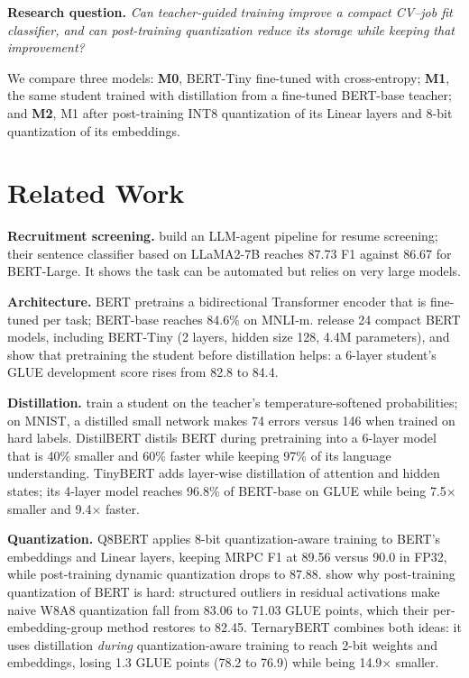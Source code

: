 \documentclass[11pt]{article}
\begin{document}
\textbf{Research question.} \emph{Can teacher-guided training improve a compact CV--job fit classifier, and can post-training quantization reduce its storage while keeping that improvement?}

We compare three models: \textbf{M0}, BERT-Tiny fine-tuned with cross-entropy; \textbf{M1}, the same student trained with distillation from a fine-tuned BERT-base teacher; and \textbf{M2}, M1 after post-training INT8 quantization of its Linear layers and 8-bit quantization of its embeddings.

\section{Related Work}
\textbf{Recruitment screening.} \citet{gan} build an LLM-agent pipeline for resume screening; their sentence classifier based on LLaMA2-7B reaches 87.73 F1 against 86.67 for BERT-Large. It shows the task can be automated but relies on very large models.

\textbf{Architecture.} BERT \citep{bert} pretrains a bidirectional Transformer encoder that is fine-tuned per task; BERT-base reaches 84.6\% on MNLI-m. \citet{turc} release 24 compact BERT models, including BERT-Tiny (2 layers, hidden size 128, 4.4M parameters), and show that pretraining the student before distillation helps: a 6-layer student's GLUE development score rises from 82.8 to 84.4.

\textbf{Distillation.} \citet{hinton} train a student on the teacher's temperature-softened probabilities; on MNIST, a distilled small network makes 74 errors versus 146 when trained on hard labels. DistilBERT \citep{distilbert} distils BERT during pretraining into a 6-layer model that is 40\% smaller and 60\% faster while keeping 97\% of its language understanding. TinyBERT \citep{tinybert} adds layer-wise distillation of attention and hidden states; its 4-layer model reaches 96.8\% of BERT-base on GLUE while being 7.5$\times$ smaller and 9.4$\times$ faster.

\textbf{Quantization.} Q8BERT \citep{q8} applies 8-bit quantization-aware training to BERT's embeddings and Linear layers, keeping MRPC F1 at 89.56 versus 90.0 in FP32, while post-training dynamic quantization drops to 87.88. \citet{bondarenko} show why post-training quantization of BERT is hard: structured outliers in residual activations make naive W8A8 quantization fall from 83.06 to 71.03 GLUE points, which their per-embedding-group method restores to 82.45. TernaryBERT \citep{ternary} combines both ideas: it uses distillation \emph{during} quantization-aware training to reach 2-bit weights and embeddings, losing 1.3 GLUE points (78.2 to 76.9) while being 14.9$\times$ smaller.
\end{document}
